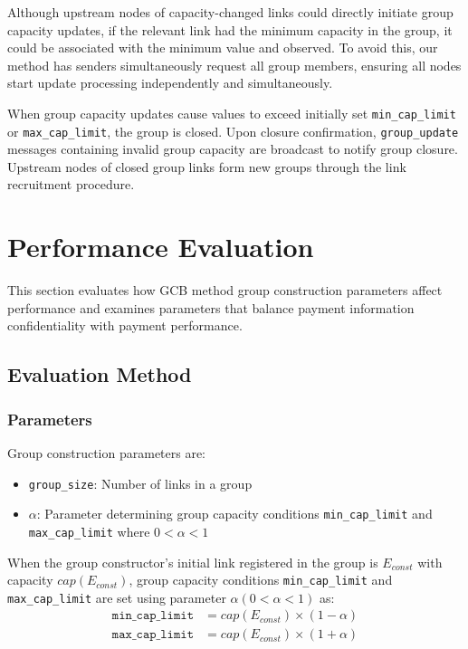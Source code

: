 \documentclass[conference]{IEEEtran}
\newcommand{\groupupdate}{\texttt{group\_update}}
\newcommand{\groupsize}{\texttt{group\_size}}
\newcommand{\mincaplimit}{\texttt{min\_cap\_limit}}
\newcommand{\maxcaplimit}{\texttt{max\_cap\_limit}}
\begin{document}
Although upstream nodes of capacity-changed links could directly initiate group capacity updates, if the relevant link had the minimum capacity in the group, it could be associated with the minimum value and observed. To avoid this, our method has senders simultaneously request all group members, ensuring all nodes start update processing independently and simultaneously.

When group capacity updates cause values to exceed initially set \mincaplimit{} or \maxcaplimit{}, the group is closed. Upon closure confirmation, \groupupdate{} messages containing invalid group capacity are broadcast to notify group closure. Upstream nodes of closed group links form new groups through the link recruitment procedure.

\section{Performance Evaluation}

This section evaluates how GCB method group construction parameters affect performance and examines parameters that balance payment information confidentiality with payment performance.

\subsection{Evaluation Method}

\subsubsection{Parameters}

Group construction parameters are:
\begin{itemize}
	\item \groupsize{}: Number of links in a group
	\item $\alpha$: Parameter determining group capacity conditions \mincaplimit{} and \maxcaplimit{} where $0 < \alpha < 1$
\end{itemize}

When the group constructor's initial link registered in the group is $E_{const}$ with capacity $cap(E_{const})$, group capacity conditions \mincaplimit{} and \maxcaplimit{} are set using parameter $\alpha (0 < \alpha < 1)$ as:
\begin{align}
	\mincaplimit & = cap(E_{const}) \times (1-\alpha) \\
	\maxcaplimit & = cap(E_{const}) \times (1+\alpha)
\end{align}
\end{document}
